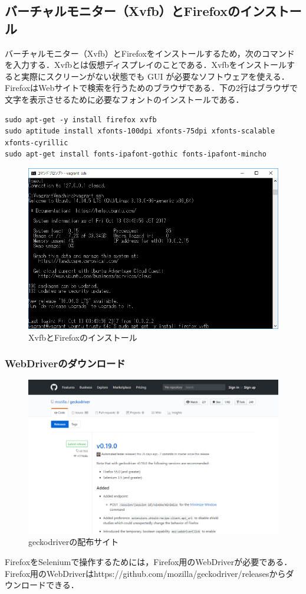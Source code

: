 \newpage
\subsection{バーチャルモニター（Xvfb）とFirefoxのインストール}
バーチャルモニター（Xvfb）とFirefoxをインストールするため，次のコマンドを入力する．Xvfbとは仮想ディスプレイのことである．Xvfbをインストールすると実際にスクリーンがない状態でも GUI が必要なソフトウェアを使える．FirefoxはWebサイトで検索を行うためのブラウザである．下の2行はブラウザで文字を表示させるために必要なフォントのインストールである．
\begin{lstlisting}[basicstyle=\ttfamily\footnotesize, frame=single]
sudo apt-get -y install firefox xvfb
sudo aptitude install xfonts-100dpi xfonts-75dpi xfonts-scalable 
xfonts-cyrillic
sudo apt-get install fonts-ipafont-gothic fonts-ipafont-mincho
\end{lstlisting}

\begin{figure}[htb]
\centering
\includegraphics[width=13cm]{img/firefox.png}
\caption{XvfbとFirefoxのインストール}
\end{figure}

\newpage
\subsubsection{WebDriverのダウンロード}
\begin{figure}[htb]
\centering
\includegraphics[width=13cm]{img/driver.png}
\caption{geckodriverの配布サイト}
\end{figure}
FirefoxをSeleniumで操作するためには，Firefox用のWebDriverが必要である．Firefox用のWebDriverはhttps://github.com/mozilla/geckodriver/releasesからダウンロードできる．


